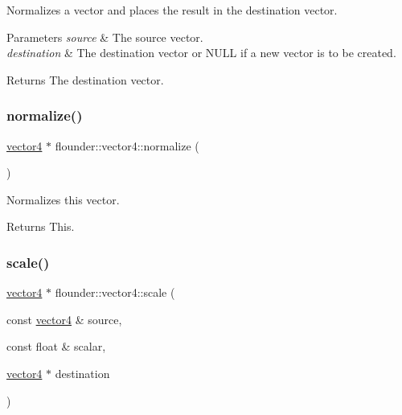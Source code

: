 Normalizes a vector and places the result in the destination vector. 


\begin{DoxyParams}{Parameters}
{\em source} & The source vector. \\
\hline
{\em destination} & The destination vector or N\+U\+LL if a new vector is to be created. \\
\hline
\end{DoxyParams}
\begin{DoxyReturn}{Returns}
The destination vector. 
\end{DoxyReturn}
\mbox{\label{classflounder_1_1vector4_aa9eec0ab63428f78de24ac90f2a20206}} 
\subsubsection{\texorpdfstring{normalize()}{normalize()}\hspace{0.1cm}{\footnotesize\ttfamily [2/2]}}
{\footnotesize\ttfamily \hyperlink{classflounder_1_1vector4}{vector4} $\ast$ flounder\+::vector4\+::normalize (\begin{DoxyParamCaption}{ }\end{DoxyParamCaption})}



Normalizes this vector. 

\begin{DoxyReturn}{Returns}
This. 
\end{DoxyReturn}
\mbox{\label{classflounder_1_1vector4_a5b5371c3619896e32b0332a336a10ee3}} 
\subsubsection{\texorpdfstring{scale()}{scale()}\hspace{0.1cm}{\footnotesize\ttfamily [1/2]}}
{\footnotesize\ttfamily \hyperlink{classflounder_1_1vector4}{vector4} $\ast$ flounder\+::vector4\+::scale (\begin{DoxyParamCaption}\item[{const \hyperlink{classflounder_1_1vector4}{vector4} \&}]{source,  }\item[{const float \&}]{scalar,  }\item[{\hyperlink{classflounder_1_1vector4}{vector4} $\ast$}]{destination }\end{DoxyParamCaption})\hspace{0.3cm}{\ttfamily [static]}}



